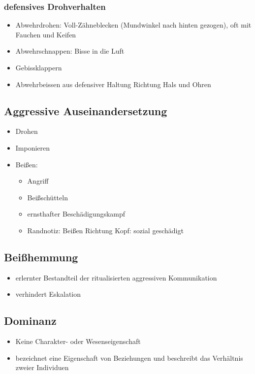         \subsubsection{defensives Drohverhalten}
            \begin{itemize}
                \item Abwehrdrohen: Voll-Zähneblecken (Mundwinkel nach hinten gezogen), oft mit Fauchen und Keifen
                \item Abwehrschnappen: Bisse in die Luft
                \item Gebissklappern
                \item Abwehrbeissen aus defensiver Haltung Richtung Hals und Ohren
            \end{itemize}

    \subsection{Aggressive Auseinandersetzung}
        \begin{itemize}
            \item Drohen
            \item Imponieren
            \item Beißen:
            \begin{itemize}
                \item Angriff
                \item Beißschütteln
                \item ernsthafter Beschädigungskampf
                \item Randnotiz: Beißen Richtung Kopf: sozial \glqq geschädigt\grqq{}{}
            \end{itemize}
        \end{itemize}

    \subsection{Beißhemmung}
        \begin{itemize}
            \item erlernter Bestandteil der ritualisierten aggressiven Kommunikation
            \item verhindert Eskalation
        \end{itemize}

    \subsection{Dominanz}
        \begin{itemize}
            \item Keine Charakter- oder Wesenseigenschaft
            \item bezeichnet eine Eigenschaft von Beziehungen und beschreibt das Verhältnis zweier Individuen
        \end{itemize}

